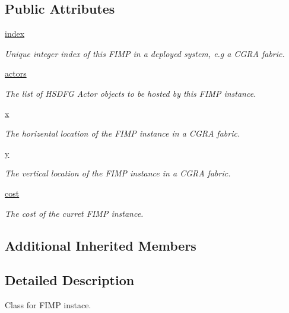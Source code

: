 \subsection*{Public Attributes}
\begin{DoxyCompactItemize}
\item 
\hyperlink{classsylva_1_1base_1_1fimp_1_1_f_i_m_p_instance_af01c88ccee9642af4e8b488c6c574fad}{index}
\begin{DoxyCompactList}\small\item\em Unique integer index of this F\+I\+MP in a deployed system, e.\+g a C\+G\+RA fabric. \end{DoxyCompactList}\item 
\hyperlink{classsylva_1_1base_1_1fimp_1_1_f_i_m_p_instance_add403074726c5a6637a9ea292d12811c}{actors}
\begin{DoxyCompactList}\small\item\em The list of H\+S\+D\+FG Actor objects to be hosted by this F\+I\+MP instance. \end{DoxyCompactList}\item 
\hyperlink{classsylva_1_1base_1_1fimp_1_1_f_i_m_p_instance_aeb9f8a37a01046643a2c4e9fefae982d}{x}
\begin{DoxyCompactList}\small\item\em The horizental location of the F\+I\+MP instance in a C\+G\+RA fabric. \end{DoxyCompactList}\item 
\hyperlink{classsylva_1_1base_1_1fimp_1_1_f_i_m_p_instance_aeca18b6f2bd24ee58b428a2f7fc90d2f}{y}
\begin{DoxyCompactList}\small\item\em The vertical location of the F\+I\+MP instance in a C\+G\+RA fabric. \end{DoxyCompactList}\item 
\hyperlink{classsylva_1_1base_1_1fimp_1_1_f_i_m_p_instance_abb77c89ca6b5831cc36d8cc6c25feeff}{cost}
\begin{DoxyCompactList}\small\item\em The cost of the curret F\+I\+MP instance. \end{DoxyCompactList}\end{DoxyCompactItemize}
\subsection*{Additional Inherited Members}


\subsection{Detailed Description}
Class for F\+I\+MP instace. 


